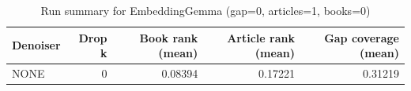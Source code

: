 \begin{table}
\caption{Run summary for EmbeddingGemma (gap=0, articles=1, books=0)}
\label{tab:summary_gap0_embeddinggemma_a1_b0}
\begin{tabular}{lrrrr}
\toprule
Denoiser & Drop k & Book rank (mean) & Article rank (mean) & Gap coverage (mean) \\
\midrule
NONE & 0 & 0.08394 & 0.17221 & 0.31219 \\
\bottomrule
\end{tabular}
\end{table}